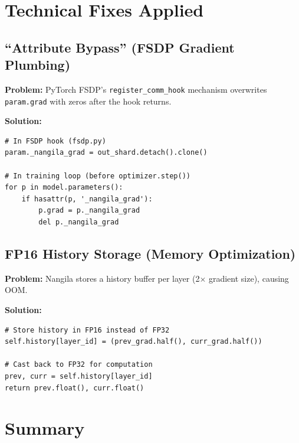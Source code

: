 \documentclass[11pt,a4paper]{article}
\begin{document}
\section{Technical Fixes Applied}

\subsection{``Attribute Bypass'' (FSDP Gradient Plumbing)}

\textbf{Problem:} PyTorch FSDP's \texttt{register\_comm\_hook} mechanism overwrites \texttt{param.grad} with zeros after the hook returns.

\textbf{Solution:}

\begin{lstlisting}
# In FSDP hook (fsdp.py)
param._nangila_grad = out_shard.detach().clone()

# In training loop (before optimizer.step())
for p in model.parameters():
    if hasattr(p, '_nangila_grad'):
        p.grad = p._nangila_grad
        del p._nangila_grad
\end{lstlisting}

\subsection{FP16 History Storage (Memory Optimization)}

\textbf{Problem:} Nangila stores a history buffer per layer (2$\times$ gradient size), causing OOM.

\textbf{Solution:}

\begin{lstlisting}
# Store history in FP16 instead of FP32
self.history[layer_id] = (prev_grad.half(), curr_grad.half())

# Cast back to FP32 for computation
prev, curr = self.history[layer_id]
return prev.float(), curr.float()
\end{lstlisting}

\section{Summary}
\end{document}
